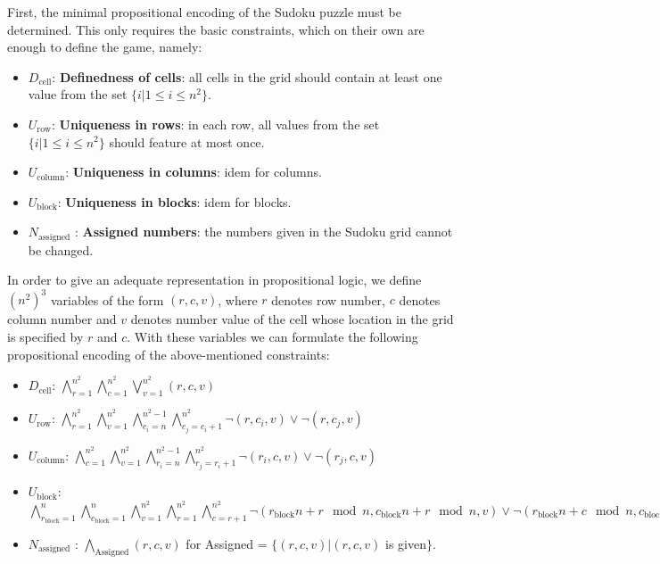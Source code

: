 \documentclass[10pt,a4paper,leqno]{article}
\newcommand{\dcell}{D_{\text{cell}}}
\newcommand{\urow}{U_{\text{row}}}
\newcommand{\ucol}{U_{\text{column}}}
\newcommand{\ublock}{U_{\text{block}}}
\begin{document}
First, the minimal propositional encoding of the Sudoku puzzle must be determined. This only requires the basic constraints, which on their own are enough to define the game, namely:

\begin{itemize}

\item $\dcell$: \textbf{Definedness of cells}: all cells in the grid should contain at least one value from the set $\{i | 1 \leq i \leq n^2\}$.

\item $\urow$: \textbf{Uniqueness in rows}: in each row, all values from the set $\{i | 1 \leq i \leq n^2\}$ should feature at most once. 

\item $\ucol$: \textbf{Uniqueness in columns}: idem for columns. 

\item $\ublock$: \textbf{Uniqueness in blocks}: idem for blocks.

\item $N_{\text{assigned}}$ : \textbf{Assigned numbers}: the numbers given in the Sudoku grid cannot be changed. 

\end{itemize}

In order to give an adequate representation in propositional logic, we define $(n^2)^3$ variables of the form $(r,c,v)$, where $r$ denotes row number, $c$ denotes column number and $v$ denotes number value of the cell whose location in the grid is specified by $r$ and $c$. With these variables we can formulate the following propositional encoding of the above-mentioned constraints:  

\begin{itemize}

\item $\dcell$: 
$\bigwedge_{r=1}^{n^2} \bigwedge_{c=1}^{n^2} \bigvee_{v=1}^{n^2} (r,c,v)$

\item $\urow$:
$\bigwedge_{r=1}^{n^2} \bigwedge_{v=1}^{n^2}\bigwedge_{c_i=n}^{n^2 - 1} \bigwedge_{c_j=c_i+1}^{n^2} \neg(r,c_i,v) \lor \neg(r,c_j,v)$


\item $\ucol$: 
$\bigwedge_{c=1}^{n^2} \bigwedge_{v=1}^{n^2}\bigwedge_{r_i=n}^{n^2-1} \bigwedge_{r_j=r_i+1}^{n^2} \neg(r_i,c,v) \lor \neg(r_j,c,v)$


\item $\ublock$:  
$\bigwedge_{r_{\text{block}} = 1}^{n} \bigwedge_{c_{\text{block}} = 1}^{n}\bigwedge_{v=1}^{n^2} \bigwedge_{r = 1}^{n^2} \bigwedge_{c = r + 1}^{n^2} \neg(r_{\text{block}} n + r \mod n,c_{\text{block}} n + r \mod n,v) \lor \neg(r_{\text{block}} n + c \mod n,c_{\text{block}} n + c \mod n,v)$

\item $N_{\text{assigned}}$ : 
$\bigwedge_{\text{Assigned}} (r,c,v)$ for Assigned = $\{ (r,c,v) | (r,c,v) $ is given$\}$.


\end{itemize}
\end{document}
